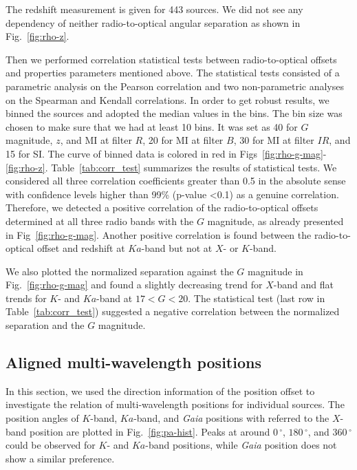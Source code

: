 \documentclass[referee]{aa}        %
\begin{document}
    The redshift measurement is given for 443 sources.
    We did not see any dependency of neither radio-to-optical angular separation as shown in Fig.~\ref{fig:rho-z}.

     Then we performed correlation statistical tests between radio-to-optical offsets and properties parameters mentioned above.
     The statistical tests consisted of a parametric analysis on the Pearson correlation and two non-parametric analyses on the Spearman and Kendall correlations.
     In order to get robust results, we binned the sources and adopted the median values in the bins.
     The bin size was chosen to make sure that we had at least 10 bins.
     It was set as 40 for $G$ magnitude, $z$, and MI at filter $R$, 20 for MI at filter $B$, 30 for MI at filter $IR$, and 15 for SI.
     The curve of binned data is colored in red in Figs~\ref{fig:rho-g-mag}-\ref{fig:rho-z}.
     Table~\ref{tab:corr_test} summarizes the results of statistical tests.
     We considered all three correlation coefficients greater than 0.5 in the absolute sense with confidence levels higher than 99\% (p-value <0.1) as a genuine correlation.
     Therefore, we detected a positive correlation of the radio-to-optical offsets determined at all three radio bands with the $G$ magnitude, as already presented in Fig~\ref{fig:rho-g-mag}.
     Another positive correlation is found between the radio-to-optical offset and redshift at $Ka$-band but not at $X$- or $K$-band.

     We also plotted the normalized separation against the $G$ magnitude in Fig.~\ref{fig:rho-g-mag} and found a slightly decreasing trend for $X$-band and flat trends for $K$- and $Ka$-band at $17<G<20$.
     The statistical test (last row in Table~\ref{tab:corr_test}) suggested a negative correlation between the normalized separation and the $G$ magnitude.


\subsection{Aligned multi-wavelength positions}    \label{subsec:pos-align}


    In this section, we used the direction information of the position offset to investigate the relation of multi-wavelength positions for individual sources.
    The position angles of $K$-band, $Ka$-band, and \textit{Gaia} positions with referred to the $X$-band position are plotted in Fig.~\ref{fig:pa-hist}.
    Peaks at around $0\,^\circ$, $180\,^\circ$, and $360\,^\circ$ could be observed for $K$- and $Ka$-band positions, while \textit{Gaia} position does not show a similar preference.
\end{document}
